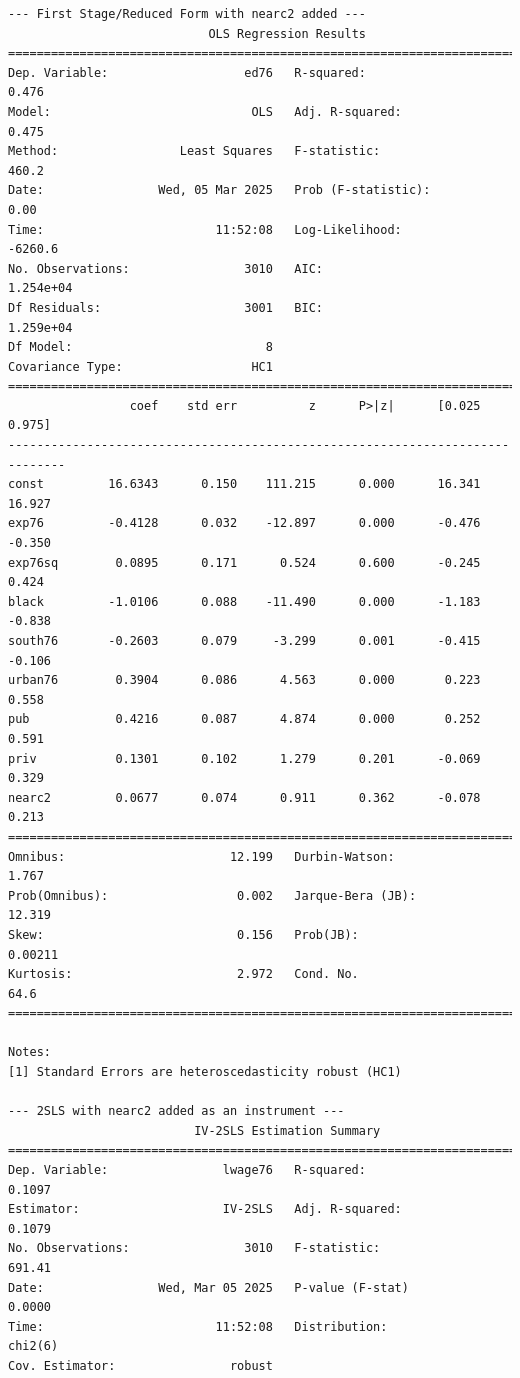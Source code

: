 \documentclass[10pt]{article}
\begin{document}
\begin{verbatim}
--- First Stage/Reduced Form with nearc2 added ---
                            OLS Regression Results                            
==============================================================================
Dep. Variable:                   ed76   R-squared:                       0.476
Model:                            OLS   Adj. R-squared:                  0.475
Method:                 Least Squares   F-statistic:                     460.2
Date:                Wed, 05 Mar 2025   Prob (F-statistic):               0.00
Time:                        11:52:08   Log-Likelihood:                -6260.6
No. Observations:                3010   AIC:                         1.254e+04
Df Residuals:                    3001   BIC:                         1.259e+04
Df Model:                           8                                         
Covariance Type:                  HC1                                         
==============================================================================
                 coef    std err          z      P>|z|      [0.025      0.975]
------------------------------------------------------------------------------
const         16.6343      0.150    111.215      0.000      16.341      16.927
exp76         -0.4128      0.032    -12.897      0.000      -0.476      -0.350
exp76sq        0.0895      0.171      0.524      0.600      -0.245       0.424
black         -1.0106      0.088    -11.490      0.000      -1.183      -0.838
south76       -0.2603      0.079     -3.299      0.001      -0.415      -0.106
urban76        0.3904      0.086      4.563      0.000       0.223       0.558
pub            0.4216      0.087      4.874      0.000       0.252       0.591
priv           0.1301      0.102      1.279      0.201      -0.069       0.329
nearc2         0.0677      0.074      0.911      0.362      -0.078       0.213
==============================================================================
Omnibus:                       12.199   Durbin-Watson:                   1.767
Prob(Omnibus):                  0.002   Jarque-Bera (JB):               12.319
Skew:                           0.156   Prob(JB):                      0.00211
Kurtosis:                       2.972   Cond. No.                         64.6
==============================================================================

Notes:
[1] Standard Errors are heteroscedasticity robust (HC1)

--- 2SLS with nearc2 added as an instrument ---
                          IV-2SLS Estimation Summary                          
==============================================================================
Dep. Variable:                lwage76   R-squared:                      0.1097
Estimator:                    IV-2SLS   Adj. R-squared:                 0.1079
No. Observations:                3010   F-statistic:                    691.41
Date:                Wed, Mar 05 2025   P-value (F-stat)                0.0000
Time:                        11:52:08   Distribution:                  chi2(6)
Cov. Estimator:                robust                                         
                                                                              

\end{verbatim}
\end{document}
